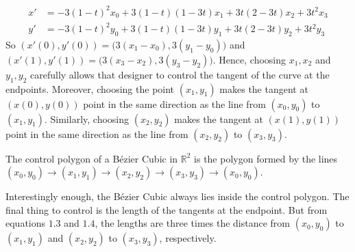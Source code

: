 \documentclass[crop=false,class=book,oneside]{standalone}
\begin{document}
\begin{align*}
    x' &= -3(1-t)^2x_0 + 3(1-t)(1-3t)x_1+3t(2-3t)x_2+3t^2x_3 \\
    y' &= -3(1-t)^2y_0 + 3(1-t)(1-3t)y_1+3t(2-3t)y_2+3t^2y_3
\end{align*}
So $(x'(0),y'(0)) = \big(3(x_1-x_0),3(y_1-y_0)\big)$ and $(x'(1),y'(1)) = \big(3(x_3-x_2),3(y_3-y_2)\big)$. Hence, choosing $x_1,x_2$ and $y_1,y_2$ carefully allows that designer to control the tangent of the curve at the endpoints. Moreover, choosing the point $(x_1,y_1)$ makes the tangent at $(x(0),y(0))$ point in the same direction as the line from $(x_0,y_0)$ to $(x_1,y_1)$. Similarly, choosing $(x_2,y_2)$ makes the tangent at $(x(1),y(1))$ point in the same direction as the line from $(x_2,y_2)$ to $(x_3,y_3)$.
\begin{definition}
The control polygon of a B\'{e}zier Cubic in $\mathbb{R}^2$ is the polygon formed by the lines $(x_0,y_0)\rightarrow(x_1,y_1)\rightarrow(x_2,y_2)\rightarrow(x_3,y_3)\rightarrow (x_0,y_0)$.
\end{definition}
Interestingly enough, the B\'{e}zier Cubic always lies inside the control polygon. The final thing to control is the length of the tangents at the endpoint. But from equations $1.3$ and $1.4$, the lengths are three times the distance from $(x_0,y_0)$ to $(x_1,y_1)$ and $(x_2,y_2)$ to $(x_3,y_3)$, respectively. 
\end{document}
